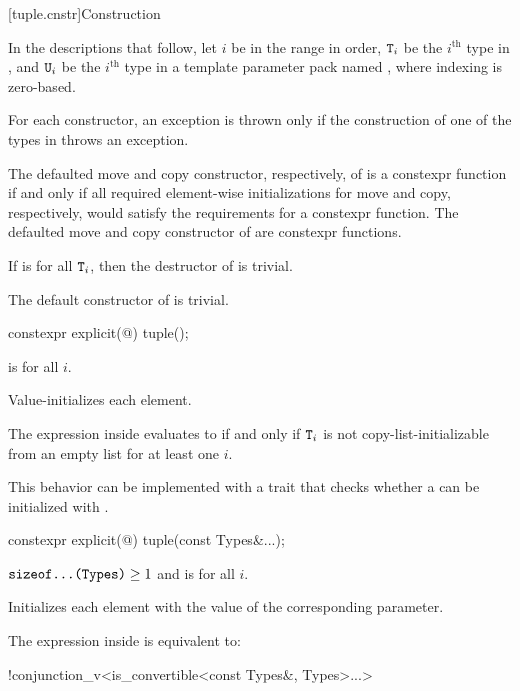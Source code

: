 \documentclass{wg21}
\begin{document}
[tuple.cnstr]{Construction}

\pnum
In the descriptions that follow, let $i$ be in the range
 in order, $\texttt{T}_i$
be the $i^\text{th}$ type in , and
$\texttt{U}_i$ be the $i^\text{th}$ type in a template parameter pack named , where indexing
is zero-based.

\pnum
For each  constructor, an exception is thrown only if the construction of
one of the types in  throws an exception.

\pnum
The defaulted move and copy constructor, respectively, of
 is a constexpr function if and only if all
required element-wise initializations for move and copy, respectively,
would satisfy the requirements for a constexpr function. The
defaulted move and copy constructor of  are
constexpr functions.

\pnum
If  is  for all $\texttt{T}_i$,
then the destructor of  is trivial.

\pnum
The default constructor of  is trivial.

%
\begin{itemdecl}
    constexpr explicit(@\seebelow@) tuple();
\end{itemdecl}

\begin{itemdescr}
    \pnum
    \constraints
     is  for all $i$.

    \pnum
    \effects
    Value-initializes each element.

    \pnum
    \remarks
    The expression inside  evaluates to 
    if and only if $\texttt{T}_i$ is not
    copy-list-initializable from an empty list
    for at least one $i$.
    \begin{note}
        This behavior can be implemented with a trait that checks whether
        a  can be initialized with \tcode{\{\}}.
    \end{note}
\end{itemdescr}

%
\begin{itemdecl}
    constexpr explicit(@\seebelow@) tuple(const Types&...);
\end{itemdecl}

\begin{itemdescr}
    \pnum
    \constraints
    $\texttt{sizeof...(Types)} \geq 1$ and
     is  for all $i$.

    \pnum
    \effects
    Initializes each element with the value of the
    corresponding parameter.

    \pnum
    \remarks
    The expression inside  is equivalent to:
    \begin{codeblock}
        !conjunction_v<is_convertible<const Types&, Types>...>
    \end{codeblock}
\end{itemdescr}
\end{document}
